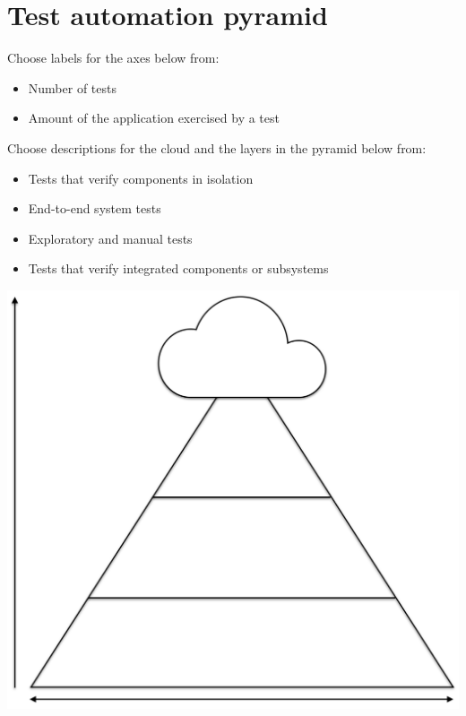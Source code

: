 \chapter*{Test automation pyramid}

Choose labels for the axes below from:

\begin{itemize}
    \item Number of tests
    \item Amount of the application exercised by a test
\end{itemize}

Choose descriptions for the cloud and the layers in the pyramid below from:

\begin{itemize}
    \item Tests that verify components in isolation
    \item End-to-end system tests
    \item Exploratory and manual tests
    \item Tests that verify integrated components or subsystems
\end{itemize}

\includegraphics[width=\textwidth]{images/empty-pyramid}
